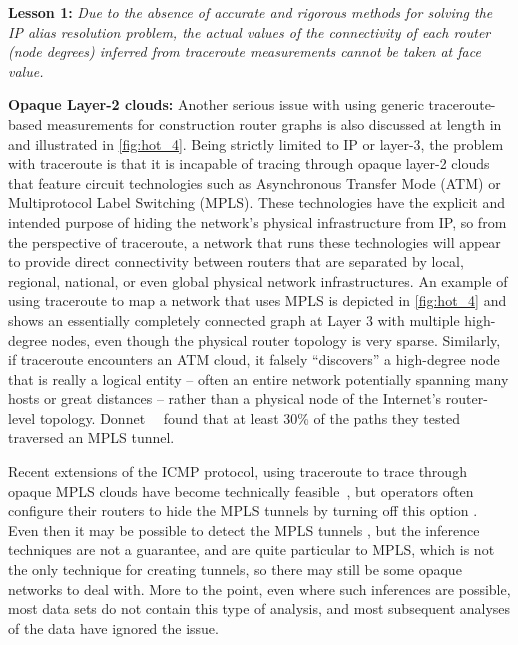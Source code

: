 {\bf Lesson 1:} {\em Due to the absence of accurate and rigorous methods for solving the IP alias
resolution problem, the actual values of the connectivity of each router (\ie node degrees)
inferred from traceroute measurements cannot be taken at face
value.}

{\bf Opaque Layer-2 clouds:} Another serious issue with
using generic traceroute-based measurements for construction router
graphs is also discussed at length in \cite{pansiot98:_inter} and
illustrated in \autoref{fig:hot_4}.  Being strictly limited to IP or
layer-3, the problem with traceroute is that it is incapable of
tracing through opaque layer-2 clouds that feature circuit
technologies such as Asynchronous Transfer Mode (ATM) or Multiprotocol
Label Switching (MPLS). These technologies have the explicit and
intended purpose of hiding the network's physical infrastructure from
IP, so from the perspective of traceroute, a network that runs these
technologies will appear to provide direct connectivity between
routers that are separated by local, regional, national, or even
global physical network infrastructures. An example of using
traceroute to map a network that uses MPLS is depicted in
\autoref{fig:hot_4} and shows an essentially completely connected
graph at Layer 3 with multiple high-degree nodes, even though the
physical router topology is very sparse. Similarly, if traceroute
encounters an ATM cloud, it falsely ``discovers'' a high-degree node
that is really a logical entity -- often an entire network potentially
spanning many hosts or great distances -- rather than a physical node
of the Internet's router-level
topology. Donnet~\etal~\cite{benoit12:_reveal_mpls} found that at
least 30\% of the paths they tested traversed an MPLS tunnel.

Recent extensions of the ICMP protocol, using traceroute to trace
through opaque MPLS clouds have become technically
feasible~\cite{rfc4950}, but operators often configure their routers to
hide the MPLS tunnels by turning off this option
\cite{sommers11:_preval_charac_mpls_deploy_open_inter}. Even then it
may be possible to detect the MPLS tunnels
\cite{benoit12:_reveal_mpls}, but the inference techniques are not a
guarantee, and are quite particular to MPLS, which is not the only
technique for creating tunnels, so there may still be some opaque
networks to deal with.  More to the point, even where such inferences
are possible, most data sets do not contain this type of analysis, and
most subsequent analyses of the data have ignored the issue.


